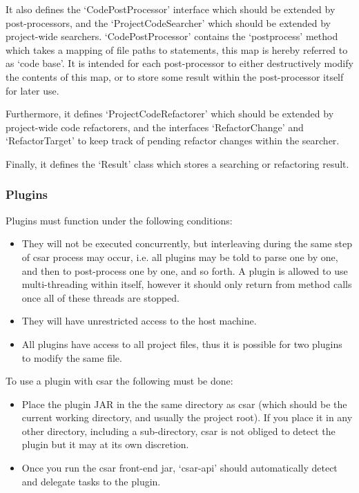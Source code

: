 \documentclass[12pt, letterpaper]{article}
\begin{document}
It also defines the `CodePostProcessor' interface which should be extended by post-processors, and the `ProjectCodeSearcher' which should be extended by project-wide searchers.
`CodePostProcessor' contains the `postprocess' method which takes a mapping of file paths to statements, this map is hereby referred to as `code base'.
It is intended for each post-processor to either destructively modify the contents of this map, or to store some result within the post-processor itself for later use.

Furthermore, it defines `ProjectCodeRefactorer' which should be extended by project-wide code refactorers, and the interfaces `RefactorChange'  and `RefactorTarget' to keep track of pending refactor changes within the searcher.

Finally, it defines the `Result' class which stores a searching or refactoring result.

\subsubsection{Plugins}
Plugins must function under the following conditions:
\begin{itemize}
  \item They will not be executed concurrently, but interleaving during the same step of csar process may occur, i.e. all plugins may be told to parse one by one, and then to post-process one by one, and so forth.
  A plugin is allowed to use multi-threading within itself, however it should only return from method calls once all of these threads are stopped.
  \item They will have unrestricted access to the host machine.
  \item All plugins have access to all project files, thus it is possible for two plugins to modify the same file.
\end{itemize}

To use a plugin with csar the following must be done:
\begin{itemize}
  \item Place the plugin JAR in the the same directory as csar (which should be the current working directory, and usually the project root).
  If you place it in any other directory, including a sub-directory, csar is not obliged to detect the plugin but it may at its own discretion.
  \item Once you run the csar front-end jar, `csar-api' should automatically detect and delegate tasks to the plugin.
\end{itemize}
\end{document}
